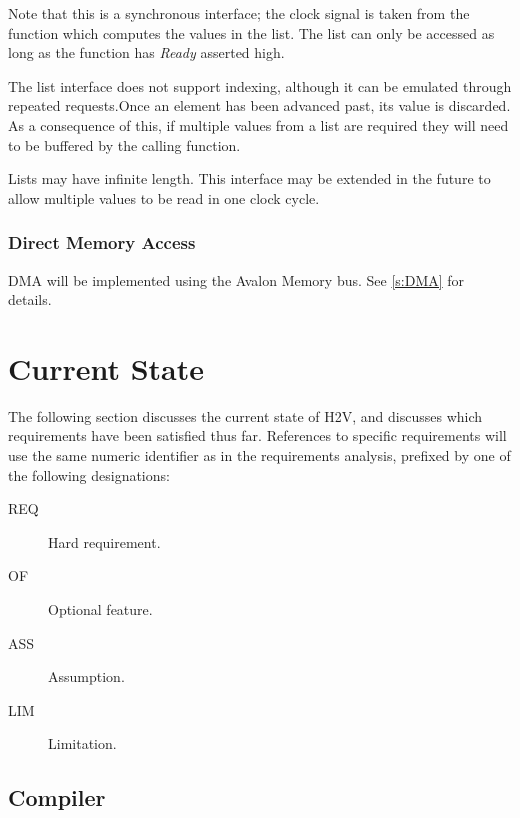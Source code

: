 \documentclass[english,onecolumn]{article}
\begin{document}
Note that this is a synchronous interface; the clock signal is taken from the function which computes the values in the list.
The list can only be accessed as long as the function has \textit{Ready} asserted high.

The list interface does not support indexing, although it can be emulated through repeated requests.\footnotemark Once an element has been advanced past, its value is discarded. As a consequence of this, if multiple values from a list are required they will need to be buffered by the calling function.

Lists may have infinite length. This interface may be extended in the future to allow multiple values to be read in one clock cycle.

\subsubsection{Direct Memory Access}
DMA will be implemented using the Avalon Memory bus. See \ref{s:DMA} for details.

\section{Current State}
The following section discusses the current state of H2V, and discusses which requirements have been satisfied thus far.
References to specific requirements will use the same numeric identifier as in the requirements analysis, prefixed by one of the following designations:

\begin{description}
        \item[REQ] Hard requirement.
        \item[OF] Optional feature.
        \item[ASS] Assumption.
        \item[LIM] Limitation.
\end{description}

\subsection{Compiler}
\end{document}
